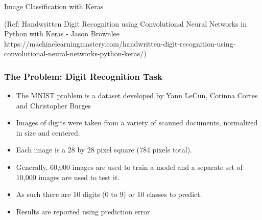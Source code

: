 \begin{frame}[fragile]\frametitle{}
\begin{center}
{\Large Image Classification with Keras}

{\tiny (Ref: Handwritten Digit Recognition using Convolutional Neural Networks in Python with Keras - Jason Brownlee https://machinelearningmastery.com/handwritten-digit-recognition-using-convolutional-neural-networks-python-keras/)}
\end{center}
\end{frame}

\begin{frame}[fragile]\frametitle{The Problem: Digit Recognition Task}
\begin{itemize}
\item The MNIST problem is a dataset developed by Yann LeCun, Corinna Cortes and Christopher Burges
\item Images of digits were taken from a variety of scanned documents, normalized in size and centered.
\item Each image is a 28 by 28 pixel square (784 pixels total). 
\item Generally, 60,000 images are used to train a model and a separate set of 10,000 images are used to test it.
\item As such there are 10 digits (0 to 9) or 10 classes to predict. 
\item Results are reported using prediction error
\end{itemize}
\end{frame}
